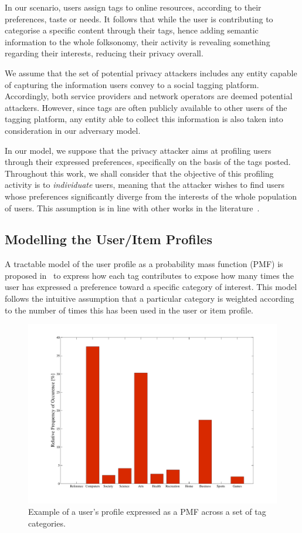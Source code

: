 In our scenario, users assign tags to online resources, according to their preferences, taste or needs. It follows that while the user is contributing to categorise a specific content through their tags, hence adding semantic information to the whole folksonomy, their activity is revealing something regarding their interests, reducing their privacy overall.

We assume that the set of potential privacy attackers includes any entity capable of capturing the information users convey to a social tagging platform. Accordingly, both service providers and network operators are deemed potential attackers. However, since tags are often publicly available to other users of the tagging platform, any entity able to collect this information is also taken into consideration in our adversary model.

In our model, we suppose that the privacy attacker aims at profiling users through their expressed preferences, specifically on the basis of the tags posted. Throughout this work, we shall consider that the objective of this profiling activity is to \emph{individuate} users, meaning that the attacker wishes to find users whose preferences significantly diverge from the interests of the whole population of users. This assumption is in line with other works in the literature~\cite{parra2014measuring,Parra13PhD,parra2014optimal}.

\subsection{Modelling the User/Item Profiles}
\label{sec:mod-profiles}
A tractable model of the user profile as a probability mass function (PMF) is proposed in~\cite{Parra10TB,Parra12DKE,Parra12TKDE,Parra13PhD} to express how each tag contributes to expose how many times the user has expressed a preference toward a specific category of interest. This model follows the intuitive assumption that a particular category is weighted according to the number of times this has been used in the user or item profile.

\begin{figure}[htb]
\includegraphics[width=\textwidth]{figures/UPRel.pdf}
\caption[User PMF.]{Example of a user's profile expressed as a PMF across a set of tag categories.
\label{fig:UserProfile}}
\end{figure}

